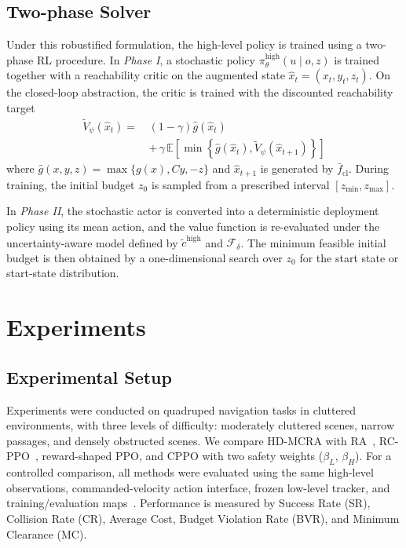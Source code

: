 \documentclass{article}
\begin{document}
\subsection{Two-phase Solver}

Under this robustified formulation, the high-level policy is trained using a two-phase RL procedure. In \emph{Phase I}, a stochastic policy $\pi_\theta^{\mathrm{high}}(u\mid o,z)$ is trained together with a reachability critic on the augmented state $\hat{x}_t=(x_t,y_t,z_t)$. On the closed-loop abstraction, the critic is trained with the discounted reachability target
\begin{equation}
\begin{aligned}
\tilde{V}_{\psi}(\hat{x}_t)
=\,&(1-\gamma)\hat{g}(\hat{x}_t) \\
&+\,\gamma\, \mathbb{E}\!\left[
\min\!\left\{\hat{g}(\hat{x}_t),\tilde{V}_{\psi}(\hat{x}_{t+1})\right\}
\right]
\end{aligned}
\end{equation}
where $\hat{g}(x,y,z)=\max\{g(x),Cy,-z\}$ and $\hat{x}_{t+1}$ is generated by $\bar{f}_{\mathrm{cl}}$. During training, the initial budget $z_0$ is sampled from a prescribed interval $[z_{\min},z_{\max}]$.

In \emph{Phase II}, the stochastic actor is converted into a deterministic deployment policy using its mean action, and the value function is re-evaluated under the uncertainty-aware model defined by $\tilde{c}^{\mathrm{high}}$ and $\mathcal{F}_{\delta}$. The minimum feasible initial budget is then obtained by a one-dimensional search over $z_0$ for the start state or start-state distribution.

\section{Experiments}
\subsection{Experimental Setup}

Experiments were conducted on quadruped navigation tasks in cluttered environments, with three levels of difficulty: moderately cluttered scenes, narrow passages, and densely obstructed scenes. We compare HD-MCRA with RA~\citep{hsu2021}, RC-PPO~\citep{so2024}, reward-shaped PPO, and CPPO with two safety weights ($\beta_L$, $\beta_H$). For a controlled comparison, all methods were evaluated using the same high-level observations, commanded-velocity action interface, frozen low-level tracker, and training/evaluation maps~\citep{achiam2017,tessler2019,guerrier2024,miki2024,weerakoon2024}. Performance is measured by Success Rate (SR), Collision Rate (CR), Average Cost, Budget Violation Rate (BVR), and Minimum Clearance (MC).
\end{document}
